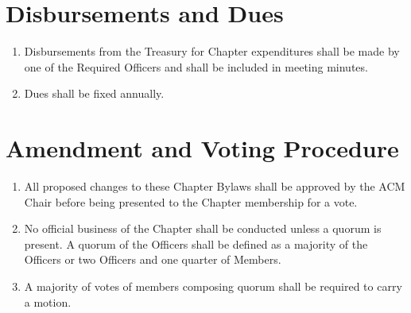 \section{Disbursements and Dues}
\begin{enumerate}
	\item Disbursements from the Treasury for Chapter expenditures shall be made by one of the Required Officers and shall be included in meeting minutes.
	\item Dues shall be fixed annually.
\end{enumerate}

\section{Amendment and Voting Procedure}
\begin{enumerate}
	\item All proposed changes to these Chapter Bylaws shall be approved by the ACM Chair before being presented to the Chapter membership for a vote.
	\item No official business of the Chapter shall be conducted unless a quorum is present. A quorum of the Officers shall be defined as a majority of the Officers or two Officers and one quarter of Members.
	\item A majority of votes of members composing quorum shall be required to carry a motion.
\end{enumerate}

